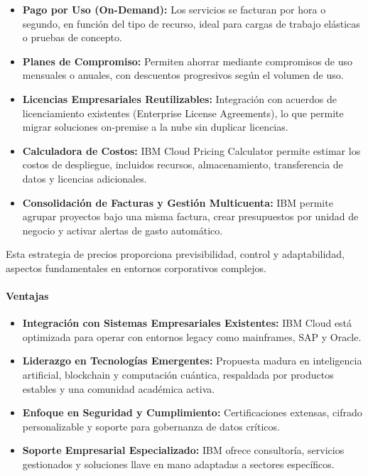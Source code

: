 {                \begin{itemize}
                    \item \textbf{Pago por Uso (On-Demand):} Los servicios se facturan por hora o segundo, en función del tipo de recurso, ideal para cargas de trabajo elásticas o pruebas de concepto.
                    \item \textbf{Planes de Compromiso:} Permiten ahorrar mediante compromisos de uso mensuales o anuales, con descuentos progresivos según el volumen de uso.
                    \item \textbf{Licencias Empresariales Reutilizables:} Integración con acuerdos de licenciamiento existentes (Enterprise License Agreements), lo que permite migrar soluciones on-premise a la nube sin duplicar licencias.
                    \item \textbf{Calculadora de Costos:} IBM Cloud Pricing Calculator permite estimar los costos de despliegue, incluidos recursos, almacenamiento, transferencia de datos y licencias adicionales.
                    \item \textbf{Consolidación de Facturas y Gestión Multicuenta:} IBM permite agrupar proyectos bajo una misma factura, crear presupuestos por unidad de negocio y activar alertas de gasto automático.
                \end{itemize}
                
                Esta estrategia de precios proporciona previsibilidad, control y adaptabilidad, aspectos fundamentales en entornos corporativos complejos.
                
                \paragraph{Ventajas}
                
                \begin{itemize}
                    \item \textbf{Integración con Sistemas Empresariales Existentes:} IBM Cloud está optimizada para operar con entornos legacy como mainframes, SAP y Oracle.
                    \item \textbf{Liderazgo en Tecnologías Emergentes:} Propuesta madura en inteligencia artificial, blockchain y computación cuántica, respaldada por productos estables y una comunidad académica activa.
                    \item \textbf{Enfoque en Seguridad y Cumplimiento:} Certificaciones extensas, cifrado personalizable y soporte para gobernanza de datos críticos.
                    \item \textbf{Soporte Empresarial Especializado:} IBM ofrece consultoría, servicios gestionados y soluciones llave en mano adaptadas a sectores específicos.
                \end{itemize}
                
}
